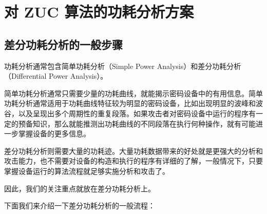 \chapter{对 ZUC 算法的功耗分析方案}
\label{chap:attack}

\section{差分功耗分析的一般步骤}
\label{sec:dpa}
功耗分析通常包含简单功耗分析（Simple Power Analysis）和差分功耗分析（Differential Power Analysis）。

简单功耗分析通常只需要少量的功耗曲线，就能揭示密码设备中的有用信息。简单功耗分析通常适用于功耗曲线特征较为明显的密码设备，比如出现明显的波峰和波谷，以及呈现出多个周期性的重复段落。如果攻击者对密码设备中运行的程序有一定的预备知识，那么就能推测出功耗曲线的不同段落在执行何种操作，就有可能进一步掌握设备的更多信息。

差分功耗分析则需要大量的功耗迹。大量功耗数据带来的好处就是更强大的分析和攻击能力，也不需要对设备的构造和执行的程序有详细的了解，一般情况下，只要掌握设备运行的算法流程就足够实施分析和攻击了。

因此，我们的关注重点就放在差分功耗分析上。

\vspace*{0.5\baselineskip}

下面我们来介绍一下差分功耗分析的一般流程：\cite{paa_cn}

